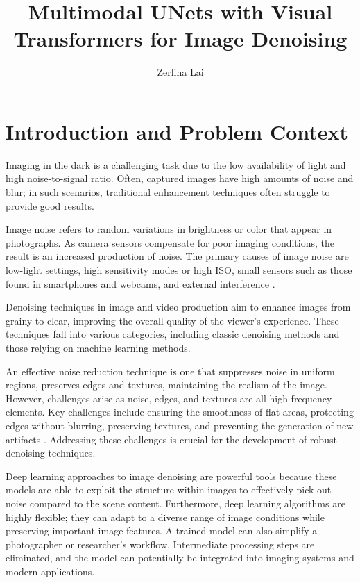 \documentclass[10pt,twocolumn]{article}
\title{Multimodal UNets with Visual Transformers for Image Denoising}
\author{Zerlina Lai}
\affiliation{Occidental College}
\begin{document}
\maketitle

\section{Introduction and Problem Context}

Imaging in the dark is a challenging task due to the low availability of light and high noise-to-signal ratio. Often, captured images have high amounts of noise and blur; in such scenarios, traditional enhancement techniques often struggle to provide good results.

Image noise refers to random variations in brightness or color that appear in photographs. As camera sensors compensate for poor imaging conditions, the result is an increased production of noise. The primary causes of image noise are low-light settings, high sensitivity modes or high ISO, small sensors such as those found in smartphones and webcams, and external interference \cite{noise}.

Denoising techniques in image and video production aim to enhance images from grainy to clear, improving the overall quality of the viewer's experience. These techniques fall into various categories, including classic denoising methods and those relying on machine learning methods.

An effective noise reduction technique is one that suppresses noise in uniform regions, preserves edges and textures, maintaining the realism of the image. However, challenges arise as noise, edges, and textures are all high-frequency elements. Key challenges include ensuring the smoothness of flat areas, protecting edges without blurring, preserving textures, and preventing the generation of new artifacts \cite{noise}. Addressing these challenges is crucial for the development of robust denoising techniques.

Deep learning approaches to image denoising are powerful tools because these models are able to exploit the structure within images to effectively pick out noise compared to the scene content. Furthermore, deep learning algorithms are highly flexible; they can adapt to a diverse range of image conditions while preserving important image features. A trained model can also simplify a photographer or researcher’s workflow. Intermediate processing steps are eliminated, and the model can potentially be integrated into imaging systems and modern applications.
\end{document}
